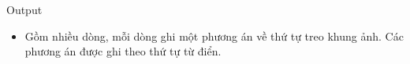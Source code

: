 Output
\begin{itemize}
	\item Gồm nhiều dòng, mỗi dòng ghi một phương án về thứ tự treo khung ảnh. Các phương án được ghi theo thứ tự từ điển.
\end{itemize}

 